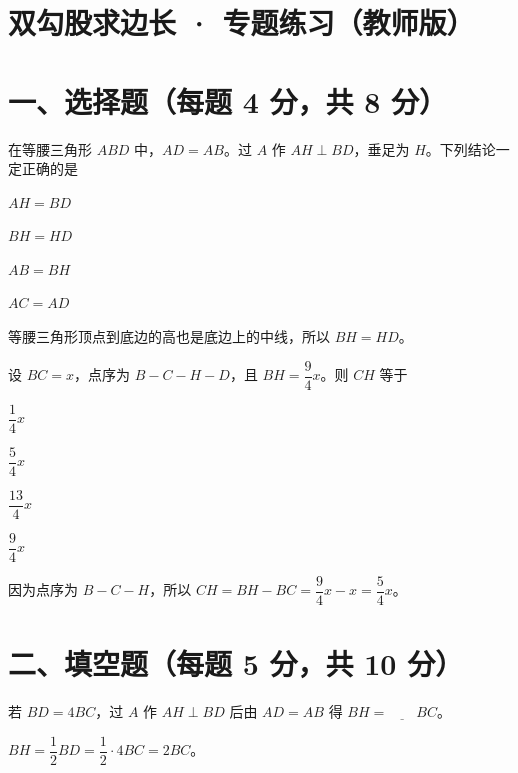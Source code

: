 \documentclass{exam-zh}
\begin{document}
\section*{双勾股求边长 · 专题练习（教师版）}

\section*{一、选择题（每题 4 分，共 8 分）}


\begin{question}[points=4]
  在等腰三角形 $ABD$ 中，$AD=AB$。过 $A$ 作 $AH\perp BD$，垂足为 $H$。下列结论一定正确的是
  \begin{choices}
    \item $AH=BD$
    \item $BH=HD$
    \item $AB=BH$
    \item $AC=AD$
  \end{choices}
  \paren[B]
  \begin{solutionblock}
    等腰三角形顶点到底边的高也是底边上的中线，所以 $BH=HD$。
  \end{solutionblock}
\end{question}



\begin{question}[points=4]
  设 $BC=x$，点序为 $B-C-H-D$，且 $BH=\dfrac94x$。则 $CH$ 等于
  \begin{choices}
    \item $\dfrac14x$
    \item $\dfrac54x$
    \item $\dfrac{13}4x$
    \item $\dfrac94x$
  \end{choices}
  \paren[B]
  \begin{solutionblock}
    因为点序为 $B-C-H$，所以 $CH=BH-BC=\dfrac94x-x=\dfrac54x$。
  \end{solutionblock}
\end{question}


\section*{二、填空题（每题 5 分，共 10 分）}


\begin{question}[points=5]
  若 $BD=4BC$，过 $A$ 作 $AH\perp BD$ 后由 $AD=AB$ 得 $BH=\underline{\quad\quad}BC$。
  \paren[$2$]
  \begin{solutionblock}
    $BH=\dfrac12BD=\dfrac12\cdot4BC=2BC$。
  \end{solutionblock}
\end{question}
\end{document}
